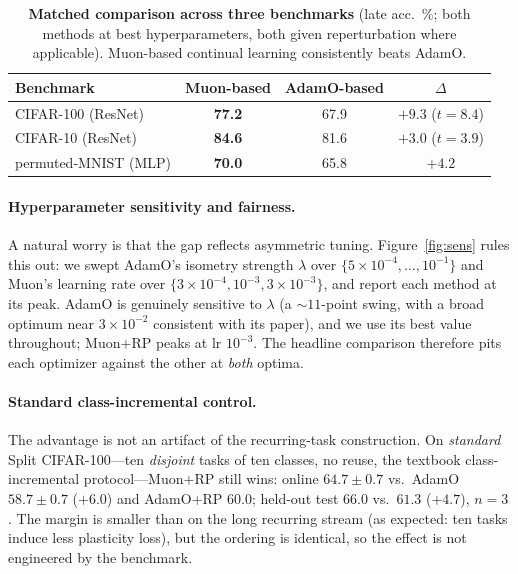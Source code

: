\documentclass[letterpaper]{article} %
\begin{document}
\begin{table}[t]\centering\small
\caption{\textbf{Matched comparison across three benchmarks} (late acc.\ \%; both methods at best hyperparameters, both given reperturbation where applicable). Muon-based continual learning consistently beats AdamO.}
\label{tab:breadth}
\begin{tabular}{lccc}
\toprule
Benchmark & Muon-based & AdamO-based & $\Delta$ \\
\midrule
CIFAR-100 (ResNet) & \textbf{77.2} & 67.9 & $+9.3$ ($t{=}8.4$) \\
CIFAR-10 (ResNet) & \textbf{84.6} & 81.6 & $+3.0$ ($t{=}3.9$) \\
permuted-MNIST (MLP) & \textbf{70.0} & 65.8 & $+4.2$ \\
\bottomrule
\end{tabular}
\end{table}


\paragraph{Hyperparameter sensitivity and fairness.} A natural worry is that the gap reflects asymmetric tuning. Figure~\ref{fig:sens} rules this out: we swept AdamO's isometry strength $\lambda$ over $\{5{\times}10^{-4},\dots,10^{-1}\}$ and Muon's learning rate over $\{3{\times}10^{-4},10^{-3},3{\times}10^{-3}\}$, and report each method at its peak. AdamO is genuinely sensitive to $\lambda$ (a $\sim$$11$-point swing, with a broad optimum near $3{\times}10^{-2}$ consistent with its paper), and we use its best value throughout; Muon$+$RP peaks at lr $10^{-3}$. The headline comparison therefore pits each optimizer against the other at \emph{both} optima.

\paragraph{Standard class-incremental control.} The advantage is not an artifact of the recurring-task construction. On \emph{standard} Split CIFAR-100---ten \emph{disjoint} tasks of ten classes, no reuse, the textbook class-incremental protocol---Muon$+$RP still wins: online $64.7{\pm}0.7$ vs.\ AdamO $58.7{\pm}0.7$ ($+6.0$) and AdamO$+$RP $60.0$; held-out test $66.0$ vs.\ $61.3$ ($+4.7$), $n{=}3$. The margin is smaller than on the long recurring stream (as expected: ten tasks induce less plasticity loss), but the ordering is identical, so the effect is not engineered by the benchmark.
\end{document}
